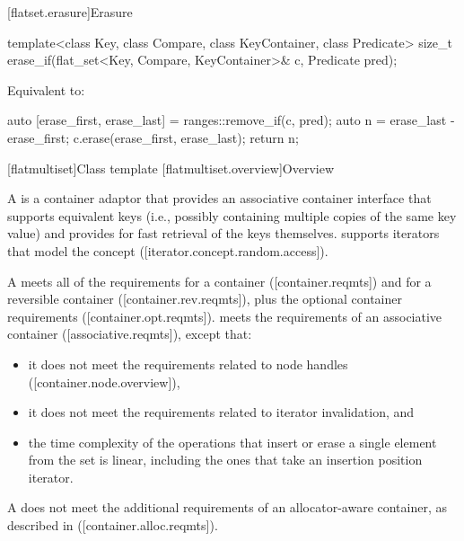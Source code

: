 \begin{addedblock}
[flatset.erasure]{Erasure}

%
\begin{itemdecl}
template<class Key, class Compare, class KeyContainer, class Predicate>
  size_t erase_if(flat_set<Key, Compare, KeyContainer>& c, Predicate pred);
\end{itemdecl}

\begin{itemdescr}
\pnum
\effects
Equivalent to:
\begin{codeblock}
  auto [erase_first, erase_last] = ranges::remove_if(c, pred);
  auto n = erase_last - erase_first;
  c.erase(erase_first, erase_last);
  return n;
\end{codeblock}
\end{itemdescr}

[flatmultiset]{Class template }
[flatmultiset.overview]{Overview}

\pnum
{}%
A  is a container adaptor that provides an associative
container interface that supports equivalent keys (i.e., possibly containing
multiple copies of the same key value) and provides for fast retrieval of the
keys themselves.  supports iterators that model
the  concept
([iterator.concept.random.access]).

\pnum
A  meets all of the requirements for a container
([container.reqmts]) and for a reversible container ([container.rev.reqmts]),
plus the optional container requirements ([container.opt.reqmts]).  
meets the requirements of an associative container ([associative.reqmts]), except that:
\begin{itemize}
\item it does not meet the requirements related to node handles ([container.node.overview]),
\item it does not meet the requirements related to iterator invalidation, and
\item the time complexity of the operations that insert or erase a single
element from the set is linear, including the ones that take an insertion
position iterator.
\end{itemize}
\begin{note}A  does not meet the additional requirements of an
allocator-aware container, as described in ([container.alloc.reqmts]).\end{note}


\end{addedblock}
